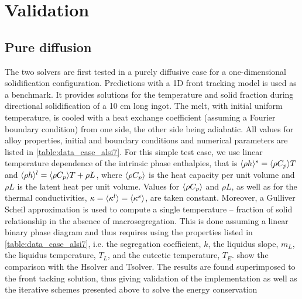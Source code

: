 \section{Validation}
%
\subsection{Pure diffusion}
The two solvers are first tested in a purely diffusive case for a one-dimensional solidification configuration. 
Predictions with a 1D front tracking model \citep{gandin_constrained_2000} is used as a benchmark. It provides 
solutions for the temperature and solid fraction during directional solidification of a 10 cm long 
ingot. The melt, with initial uniform temperature, is cooled with a heat exchange coefficient (assuming a Fourier 
boundary condition) from one side, the other side being adiabatic. All values for alloy properties, initial and 
boundary conditions and numerical parameters are listed in \cref{table:data_case_alsi7}. For this simple test case, 
we use linear temperature dependence of the intrinsic phase enthalpies, that is $\langle  \rho h  \rangle^s= \langle  \rho C_p  \rangle T$ and $\langle  \rho h  \rangle^l= \langle  \rho C_p  \rangle T + \rho L$, 
where $\langle  \rho C_p  \rangle$ is the heat capacity per unit volume and $\rho L$ is the latent heat per unit volume. Values for $\langle  \rho C_p  \rangle$ 
and $\rho L$, as well as for the thermal conductivities, $\kappa = \langle \kappa^l \rangle = \langle \kappa^s \rangle$, are taken constant. Moreover, a 
Gulliver Scheil approximation is used to compute a single temperature – fraction of solid relationship in the 
absence of macrosegregation. This is done assuming a linear binary phase diagram and thus requires using the 
properties listed in \cref{table:data_case_alsi7}, i.e. the segregation coefficient, $k$, the liquidus slope, $m_L$, the 
liquidus temperature, $T_L$, and the eutectic temperature, $T_E$.  show the comparison with 
the Hsolver and Tsolver. The results are found superimposed to the front tacking solution, thus giving validation 
of the implementation as well as the iterative schemes presented above to solve the energy conservation 
